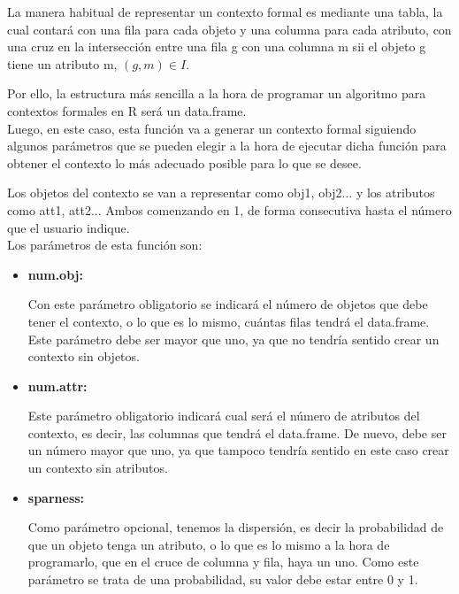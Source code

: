     La manera habitual de representar un contexto formal es mediante una tabla, la cual contar\'a con una fila para cada objeto y una columna 
    para cada atributo, con una cruz en la intersecci\'on entre una fila g con una columna m sii el objeto g tiene un atributo m, \( (g,m) \in 
    I \).

    Por ello, la estructura m\'as sencilla a la hora de programar un algoritmo para contextos formales en R ser\'a un data.frame.
    \\


    Luego, en este caso, esta funci\'on va a generar un contexto formal siguiendo algunos par\'ametros que se pueden elegir a la 
    hora de ejecutar dicha funci\'on para obtener el contexto lo m\'as adecuado posible para lo que se desee.

    Los objetos del contexto se van a representar como obj1, obj2... y los atributos como att1, att2... Ambos comenzando en 1, de forma 
    consecutiva hasta el n\'umero que el usuario indique.
    \\

    Los par\'ametros de esta funci\'on son:

    \begin{itemize}
        \item \textbf{num.obj:}

        Con este par\'ametro obligatorio se indicar\'a el n\'umero de objetos que debe tener el contexto, o lo que es lo mismo, 
        cu\'antas filas tendr\'a el data.frame. Este par\'ametro debe ser mayor que uno, 
        ya que no tendr\'ia sentido crear un contexto sin objetos.


        \item \textbf{num.attr:}

        Este par\'ametro obligatorio indicar\'a cual ser\'a el n\'umero de atributos del contexto, es decir, las columnas que tendr\'a el 
        data.frame. De nuevo, debe ser un n\'umero mayor que uno, ya que tampoco tendr\'ia sentido en este caso crear un contexto sin 
        atributos.

        \item \textbf{sparness:}

        Como par\'ametro opcional, tenemos la dispersi\'on, es decir la probabilidad de que un objeto tenga un atributo, o lo que es 
        lo mismo a la hora de programarlo, que en el cruce de columna y fila, haya un uno.
        Como este par\'ametro se trata de una probabilidad, su valor debe estar entre 0 y 1.

    \end{itemize}


